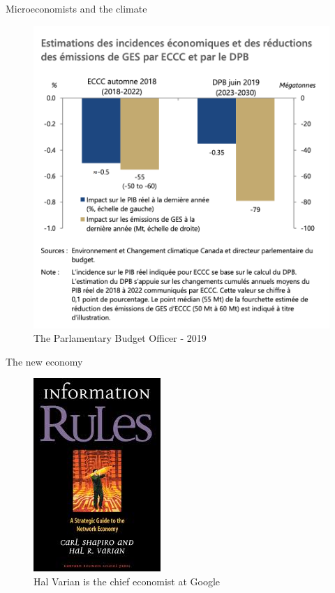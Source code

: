 \documentclass[handout]{beamer}
\begin{document}
\begin{frame}{Microeconomists and the climate}

\begin{figure}
	\includegraphics[scale=0.35]{climat.png}
	\caption{The Parlamentary Budget Officer - 2019}
\end{figure}

\end{frame}


\begin{frame}{The new economy}

\begin{figure}
	\includegraphics[scale=0.5]{rules.jpeg}
	\caption{Hal Varian is the chief economist at Google}
\end{figure}

\end{frame}
\end{document}
